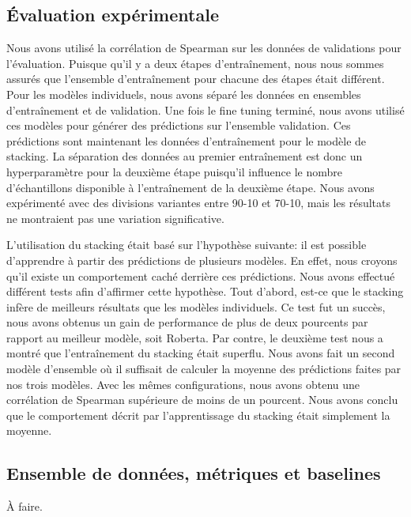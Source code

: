 \documentclass[11pt,a4paper, french]{article}
\begin{document}
\subsection{Évaluation expérimentale }

Nous avons utilisé la corrélation de Spearman sur les données de validations pour l’évaluation. Puisque qu’il y a deux étapes d'entraînement, nous nous sommes assurés que l’ensemble d'entraînement pour chacune des étapes était différent. Pour les modèles individuels, nous avons séparé les données en ensembles d'entraînement et de validation. Une fois le fine tuning terminé, nous avons utilisé ces modèles pour générer des prédictions sur l’ensemble validation. Ces prédictions sont maintenant les données d'entraînement pour le modèle de stacking. La séparation des données au premier entraînement est donc un hyperparamètre pour la deuxième étape puisqu’il influence le nombre d’échantillons disponible à l'entraînement de la deuxième étape. Nous avons expérimenté avec des divisions variantes entre 90-10 et 70-10, mais les résultats ne montraient pas une variation significative. 

	L’utilisation du stacking était basé sur l’hypothèse suivante: il est possible d’apprendre à partir des prédictions de plusieurs modèles. En effet, nous croyons qu’il existe un comportement caché derrière ces prédictions. Nous avons effectué différent tests afin d’affirmer cette hypothèse. Tout d'abord, est-ce que le stacking infère de meilleurs résultats que les modèles individuels. Ce test fut un succès, nous avons obtenus un gain de performance de plus de deux pourcents par rapport au meilleur modèle, soit Roberta. Par contre, le deuxième test nous a montré que l'entraînement du stacking était superflu. Nous avons fait un second modèle d’ensemble où il suffisait de calculer la moyenne des prédictions faites par nos trois modèles. Avec les mêmes configurations, nous avons obtenu une corrélation de Spearman supérieure de moins de un pourcent. Nous avons conclu que le comportement décrit par l’apprentissage du stacking était simplement la moyenne.



\subsection{Ensemble de données, métriques et baselines }

À faire. 
\end{document}
